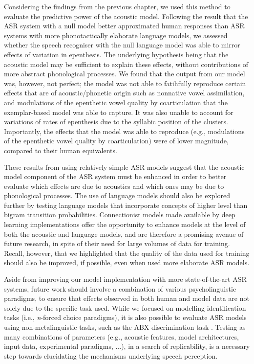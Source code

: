 Considering the findings from the previous chapter, we used this method to evaluate the predictive power of the acoustic model. Following the result that the ASR system with a null model better approximated human responses than ASR systems with more phonotactically elaborate language models, we assessed whether the speech recogniser with the null language model was able to mirror effects of variation in epenthesis. The underlying hypothesis being that the acoustic model may be sufficient to explain these effects, without contributions of more abstract phonological processes. We found that the output from our model was, however, not perfect; the model was not able to fatihfully reproduce certain effects that are of acoustic/phonetic origin such as nonnative vowel assimilation, and modulations of the epenthetic vowel quality by coarticulation that the exemplar-based model was able to capture. It was also unable to account for variations of rates of epenthesis due to the syllabic position of the clusters. Importantly, the effects that the model was able to reproduce (e.g., modulations of the epenthetic vowel quality by  coarticulation) were of lower magnitude, compared to their human equivalents. 

These results from using relatively simple ASR models suggest that the acoustic model component of the ASR system must be enhanced in order to better evaluate which effects are due to acoustics and which ones may be due to phonological processes.
The use of language models should also be explored further by testing language models that incorporate concepts of higher level than bigram transition probabilities.
Connectionist models made available by deep learning implementations offer the opportunity to enhance models at the level of both the acoustic and language models, and are therefore a promising avenue of future research, in spite of their need for large volumes of data for training. Recall, however, that we highlighted that the quality of the data used for training should also be improved, if possible, even when used more elaborate ASR models.

Aside from improving our model implementation with more state-of-the-art ASR systems, future work should involve a combination of various psycholinguistic paradigms, to ensure that effects observed in both human and model data are not solely due to the specific task used. While we focused on modelling identification tasks (i.e., \textit{n}-forced choice paradigms), it is also possible to evaluate ASR models using non-metalinguistic tasks, such as the ABX discrimination task \cite{schatz2018}. Testing as many combinations of parameters (e.g., acoustic features, model architectures, input data, experimental paradigms, ...), in a search of replicability, is a necessary step towards elucidating the mechanisms underlying speech perception.\\

